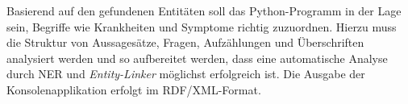 Basierend auf den gefundenen Entitäten soll das Python-Programm in der Lage sein, Begriffe wie Krankheiten und Symptome richtig zuzuordnen. Hierzu muss die Struktur von Aussagesätze, Fragen, Aufzählungen und Überschriften analysiert werden und so aufbereitet werden, dass eine automatische Analyse durch NER und \emph{Entity-Linker} möglichst erfolgreich ist. Die Ausgabe der Konsolenapplikation erfolgt im RDF/XML-Format.

